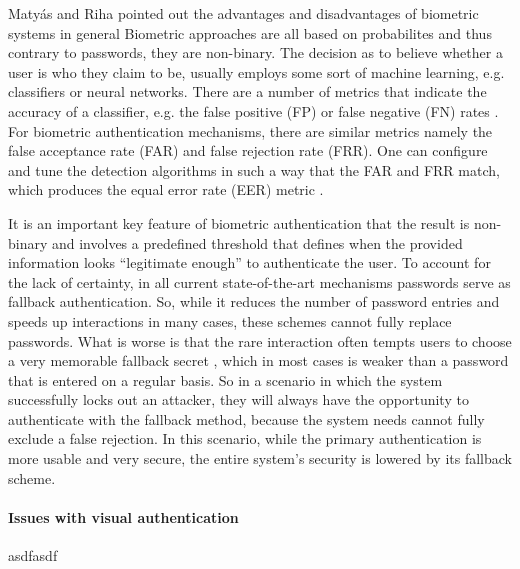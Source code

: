 Matyás and Riha pointed out the advantages and disadvantages of biometric systems in general \cite{Matyas2003ReliableUserAuthentication}
Biometric approaches are all based on probabilites and thus contrary to passwords, they are non-binary. The decision as to believe whether a user is who they claim to be, usually employs some sort of machine learning, e.g. classifiers or neural networks. There are a number of metrics that indicate the accuracy of a classifier, e.g. the false positive (FP) or false negative (FN) rates \ar. For biometric authentication mechanisms, there are similar metrics namely the false acceptance rate (FAR) and false rejection rate (FRR). One can configure and tune the detection algorithms in such a way that the FAR and FRR match, which produces the equal error rate (EER) metric \ar. 

It is an important key feature of biometric authentication that the result is non-binary and involves a predefined threshold that defines when the provided information looks ``legitimate enough'' to authenticate the user. To account for the lack of certainty, in all current state-of-the-art mechanisms passwords serve as fallback authentication. So, while it reduces the number of password entries and speeds up interactions in many cases, these schemes cannot fully replace passwords. What is worse is that the rare interaction often tempts users to choose a very memorable fallback secret \cite{Cherapau2015ImpactOfTouchID}, which in most cases is weaker than a password that is entered on a regular basis. So in a scenario in which the system successfully locks out an attacker, they will always have the opportunity to authenticate with the fallback method, because the system needs cannot fully exclude a false rejection. In this scenario, while the primary authentication is more usable and very secure, the entire system's security is lowered by its fallback scheme.  


\paragraph{Issues with visual authentication}
asdfasdf

